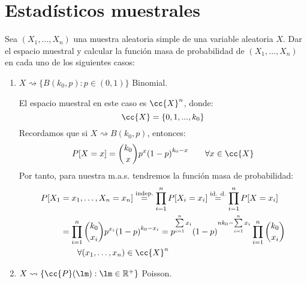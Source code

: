 \section{Estadísticos muestrales}

\begin{ejercicio}
    Sea $(X_1, \ldots, X_n)$ una muestra aleatoria simple de una variable aleatoria $X$. Dar el espacio muestral y calcular la función masa de probabilidad de $(X_1, \ldots, X_n)$ en cada uno de los siguientes casos:
    \begin{enumerate}[label=\alph*)]
        \item $X\rightsquigarrow \{B(k_0,p) : p\in (0,1)\}$ Binomial.

            El espacio muestral en este caso es $\cc{X}^n$, donde:
            \begin{equation*}
                \cc{X} = \{0, 1, ..., k_0\}
            \end{equation*}
            Recordamos que si $X\rightsquigarrow B(k_0,p)$, entonces:
            \begin{equation*}
                P[X=x] = \binom{k_0}{x} p^x {(1-p)}^{k_0-x} \qquad \forall x\in \cc{X}
            \end{equation*}
            Por tanto, para nuestra m.a.s. tendremos la función masa de probabilidad:
            \begin{align*}
                P[X_1 &= x_1, \ldots, X_n = x_n] \stackrel{\text{indep.}}{=} \prod_{i=1}^{n}P[X_i = x_i]\stackrel{\text{id. d.}}{=} \prod_{i=1}^{n} P[X=x_i] \\
                      &= \prod_{i=1}^{n} \binom{k_0}{x_i} p^{x_i} {(1-p)}^{k_0-x_i} = p^{\sum\limits_{i=1}^{n}x_i} {(1-p)}^{nk_0 - \sum\limits_{i=1}^{n}x_i} \prod_{i=1}^{n}\binom{k_0}{x_i} \\
                      & \qquad \forall (x_1, \ldots, x_n) \in \cc{X}^n
            \end{align*}
        \item $X\rightsquigarrow\{\cc{P}(\lm) : \lm \in \mathbb{R}^+\}$ Poisson.


\end{enumerate}
\end{ejercicio}
